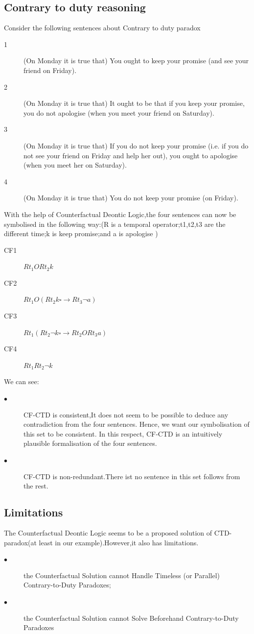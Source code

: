 \documentclass{article}
\begin{document}
\subsection{ Contrary to duty reasoning}
Consider the following sentences about Contrary to duty paradox
\begin{description}
\item[1] (On Monday it is true that) You ought to keep your promise (and see your friend on Friday).
\item[2] (On Monday it is true that) It ought to be that if you keep your promise, you do not apologise (when you meet your friend on Saturday).
\item[3](On Monday it is true that) If you do not keep your promise (i.e. if you do not see your friend on Friday and help her out), you ought to apologise (when you meet her on Saturday).
\item[4](On Monday it is true that) You do not keep your promise (on Friday).
\end{description}
With the help of Counterfactual Deontic Logic,the four sentences can now be symbolised in the following way:(R is a temporal operator;t1,t2,t3 are the different time;k is keep promise;and a is apologise )
\begin{description}
\item[CF1]$Rt_{1}ORt_{2}k$
\item[CF2]$Rt_{1}O(Rt_{2}k \square \rightarrow Rt_{3}\neg a)$
\item[CF3]$Rt_{1}(Rt_{2}\neg k \square \rightarrow Rt_{2}ORt_{3}a)$
\item[CF4]$Rt_{1}Rt_{2}\neg k$
\end{description}
We can see:
\begin{description}
\item[$\bullet$] CF-CTD is consistent,It does not seem to be possible to deduce any contradiction from the four sentences. Hence, we want our symbolisation of this set to be consistent. In this respect, CF-CTD is an intuitively plausible formalisation of the four sentences.
\item[$\bullet$] CF-CTD is non-redundant.There ist no sentence in this set follows from the rest.

\end{description}
\subsection{Limitations}
The Counterfactual Deontic Logic seems to be a proposed solution of CTD-paradox(at least in our example).However,it also has limitations.\\
\begin{description}
\item[$\bullet$]the Counterfactual Solution cannot Handle Timeless (or Parallel)
Contrary-to-Duty Paradoxes;
\item[$\bullet$]the Counterfactual Solution cannot Solve Beforehand
Contrary-to-Duty Paradoxes
\end{description}
\end{document}
